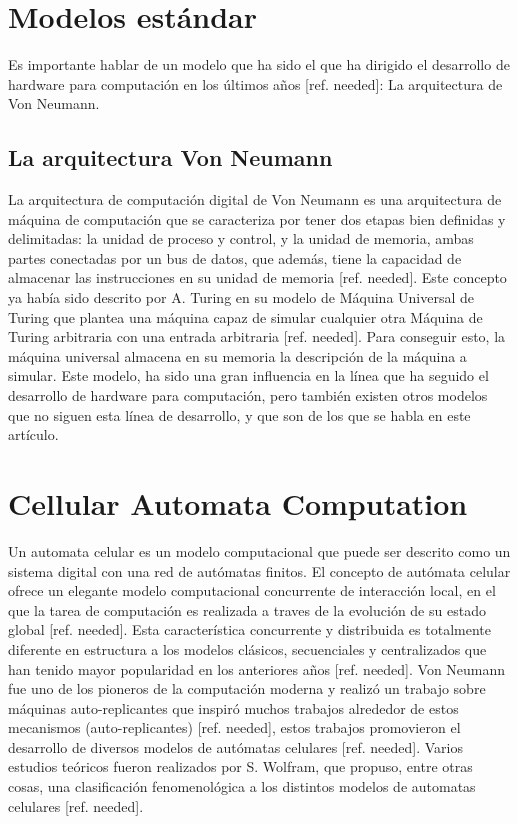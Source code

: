 \documentclass[conference]{IEEEtran}
\begin{document}
\section{Modelos estándar}
Es importante hablar de un modelo que ha sido el que ha dirigido el desarrollo de hardware para computación en los últimos años [ref. needed]: La arquitectura de Von Neumann.

\subsection{La arquitectura Von Neumann}
La arquitectura de computación digital de Von Neumann es una arquitectura de máquina de computación que se caracteriza por tener dos etapas bien definidas y delimitadas: la unidad de proceso y control, y la unidad de memoria, ambas partes conectadas por un bus de datos, que además, tiene la capacidad de almacenar las instrucciones en su unidad de memoria [ref. needed]. Este concepto ya había sido descrito por A. Turing en su modelo de Máquina Universal de Turing que plantea una máquina capaz de simular cualquier otra Máquina de Turing arbitraria con una entrada arbitraria [ref. needed]. Para conseguir esto, la máquina universal almacena en su memoria la descripción de la máquina a simular.
Este modelo, ha sido una gran influencia en la línea que ha seguido el desarrollo de hardware para computación, pero también existen otros modelos que no siguen esta línea de desarrollo, y que son de los que se habla en este artículo.

\section{Cellular Automata Computation}
Un automata celular es un modelo computacional que puede ser descrito como un sistema digital con una red de autómatas finitos. El concepto de autómata celular ofrece un elegante modelo computacional concurrente de interacción local, en el que la tarea de computación es realizada a traves de la evolución de su estado global [ref. needed]. Esta característica concurrente y distribuida es totalmente diferente en estructura a los modelos clásicos, secuenciales y centralizados que han tenido mayor popularidad en los anteriores años [ref. needed]. Von Neumann fue uno de los pioneros de la computación moderna y realizó un trabajo sobre máquinas auto-replicantes que inspiró muchos trabajos alrededor de estos mecanismos (auto-replicantes) [ref. needed], estos trabajos promovieron el desarrollo de diversos modelos de autómatas celulares [ref. needed]. Varios estudios teóricos  fueron realizados por S. Wolfram, que propuso, entre otras cosas, una clasificación fenomenológica a los distintos modelos de automatas celulares [ref. needed].
\end{document}
